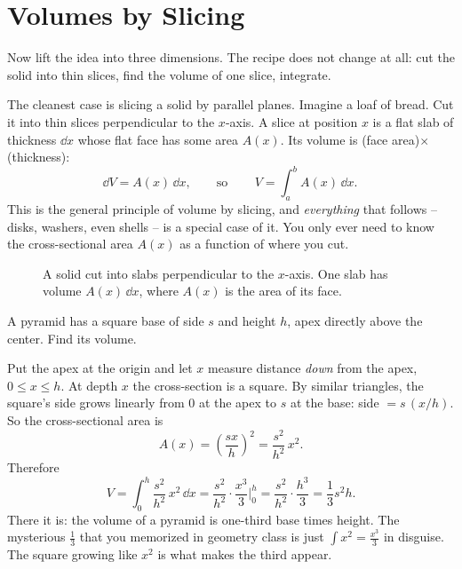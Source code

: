 \section{Volumes by Slicing}
\label{ch26:slicing}

Now lift the idea into three dimensions. The recipe does not change at all: cut
the solid into thin slices, find the volume of one slice, integrate.

The cleanest case is slicing a solid by parallel planes. Imagine a loaf of bread.
Cut it into thin slices perpendicular to the $x$-axis. A slice at position $x$ is
a flat slab of thickness $\dd x$ whose flat face has some area $A(x)$. Its volume
is (face area)$\times$(thickness):
\[
  \dd V = A(x)\,\dd x, \qquad\text{so}\qquad
  \boxed{\,V = \int_a^b A(x)\,\dd x.\,}
\]
This is the general principle of volume by slicing, and \emph{everything} that
follows -- disks, washers, even shells -- is a special case of it. You only ever
need to know the cross-sectional area $A(x)$ as a function of where you cut.

\begin{figure}[H]
\centering
{}
\caption{A solid cut into slabs perpendicular to the $x$-axis. One slab has
volume $A(x)\,\dd x$, where $A(x)$ is the area of its face.}
\label{ch26:fig-slicing}
\end{figure}

\begin{example}
\label{ch26:ex-pyramid}
A pyramid has a square base of side $s$ and height $h$, apex directly above the
center. Find its volume.

Put the apex at the origin and let $x$ measure distance \emph{down} from the apex,
$0 \le x \le h$. At depth $x$ the cross-section is a square. By similar triangles,
the square's side grows linearly from $0$ at the apex to $s$ at the base:
side $= s\,(x/h)$. So the cross-sectional area is
\[
  A(x) = \left(\frac{s x}{h}\right)^2 = \frac{s^2}{h^2}\,x^2.
\]
Therefore
\[
  V = \int_0^h \frac{s^2}{h^2}\,x^2\,\dd x
    = \frac{s^2}{h^2}\cdot\frac{x^3}{3}\Big|_0^h
    = \frac{s^2}{h^2}\cdot\frac{h^3}{3}
    = \frac{1}{3}s^2 h.
\]
There it is: the volume of a pyramid is one-third base times height. The mysterious
$\tfrac13$ that you memorized in geometry class is just $\int x^2 = \tfrac{x^3}{3}$
in disguise. The square growing like $x^2$ is what makes the third appear.
\end{example}

